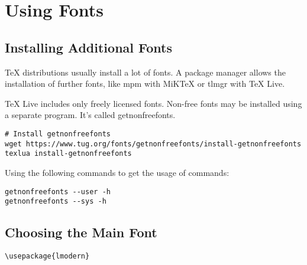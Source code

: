 
\chapter{Using Fonts}
\label{cha:using-fonts}

\section{Installing Additional Fonts}
\label{sec:inst-addit-fonts}

TeX distributions usually install a lot of fonts.
A package manager allows the installation of further fonts, like mpm with MiKTeX or tlmgr with TeX Live.



TeX Live includes only freely licensed fonts.
Non-free fonts may be installed using a separate program. It's called getnonfreefonts. 

\begin{lstlisting}[language=Sh]
# Install getnonfreefonts
wget https://www.tug.org/fonts/getnonfreefonts/install-getnonfreefonts
texlua install-getnonfreefonts
\end{lstlisting}


Using the following commands to get the usage of commands:
\begin{lstlisting}[language=Sh]
getnonfreefonts --user -h  
getnonfreefonts --sys -h  
\end{lstlisting}


\section{Choosing the Main Font}
\label{sec:choosing-main-font}

\begin{lstlisting}
\usepackage{lmodern}
\end{lstlisting}





